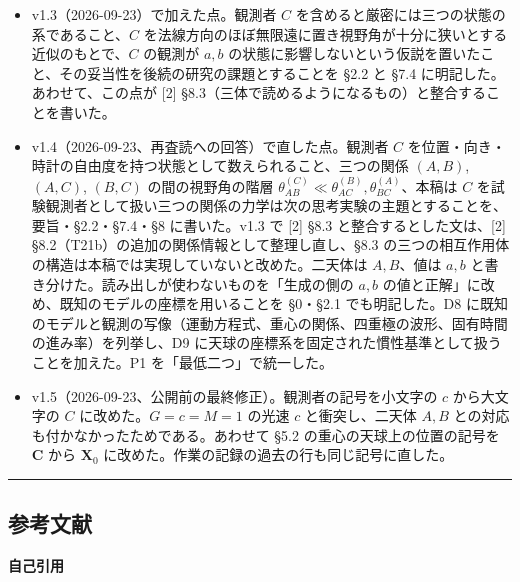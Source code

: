 \documentclass[
  a4paper,
]{ltjsarticle}
\begin{document}
\begin{itemize}
  が調和座標での座標の隔たりであることを書いた。D2 の \(\nu\)
  の自由な当てはめが上限 \(1/4\)
  をわずかに越えたことを記した。要旨と結論の誤差の範囲を実際の分布に合わせ、「軌道が読み出せる」の意味を定義した。D8・D9
  と {[}0{]} §5・§6 の関係を設計仮定として書き直した。
\item
  v1.3（2026-09-23）で加えた点。観測者 \(C\)
  を含めると厳密には三つの状態の系であること、\(C\)
  を法線方向のほぼ無限遠に置き視野角が十分に狭いとする近似のもとで、\(C\)
  の観測が \(a, b\)
  の状態に影響しないという仮説を置いたこと、その妥当性を後続の研究の課題とすることを
  §2.2 と §7.4 に明記した。あわせて、この点が {[}2{]}
  §8.3（三体で読めるようになるもの）と整合することを書いた。
\item
  v1.4（2026-09-23、再査読への回答）で直した点。観測者 \(C\)
  を位置・向き・時計の自由度を持つ状態として数えられること、三つの関係
  \((A,B)\), \((A,C)\), \((B,C)\) の間の視野角の階層
  \(\theta_{AB}^{(C)}\ll\theta_{AC}^{(B)},\theta_{BC}^{(A)}\)、本稿は
  \(C\)
  を試験観測者として扱い三つの関係の力学は次の思考実験の主題とすることを、要旨・§2.2・§7.4・§8
  に書いた。v1.3 で {[}2{]} §8.3 と整合するとした文は、{[}2{]}
  §8.2（T21b）の追加の関係情報として整理し直し、§8.3
  の三つの相互作用体の構造は本稿では実現していないと改めた。二天体は
  \(A, B\)、値は \(a, b\)
  と書き分けた。読み出しが使わないものを「生成の側の \(a, b\)
  の値と正解」に改め、既知のモデルの座標を用いることを §0・§2.1
  でも明記した。D8
  に既知のモデルと観測の写像（運動方程式、重心の関係、四重極の波形、固有時間の進み率）を列挙し、D9
  に天球の座標系を固定された慣性基準として扱うことを加えた。P1
  を「最低二つ」で統一した。
\item
  v1.5（2026-09-23、公開前の最終修正）。観測者の記号を小文字の \(c\)
  から大文字の \(C\) に改めた。\(G=c=M=1\) の光速 \(c\) と衝突し、二天体
  \(A, B\) との対応も付かなかったためである。あわせて §5.2
  の重心の天球上の位置の記号を \(\mathbf C\) から \(\mathbf X_0\)
  に改めた。作業の記録の過去の行も同じ記号に直した。
\end{itemize}

\begin{center}\rule{0.5\linewidth}{0.5pt}\end{center}

\subsection{参考文献}\label{ux53c2ux8003ux6587ux732e}

\textbf{自己引用}
\end{document}
